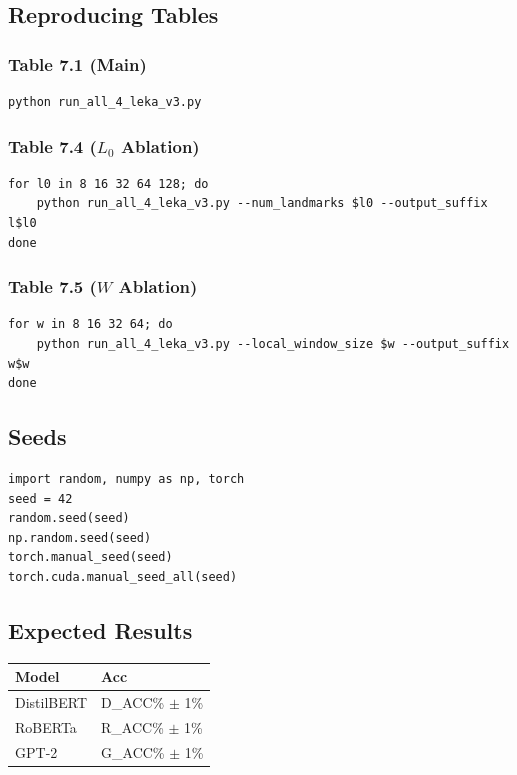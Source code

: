 \subsection{Reproducing Tables}

\subsubsection{Table 7.1 (Main)}
\begin{lstlisting}
python run_all_4_leka_v3.py
\end{lstlisting}

\subsubsection{Table 7.4 ($L_0$ Ablation)}
\begin{lstlisting}
for l0 in 8 16 32 64 128; do
    python run_all_4_leka_v3.py --num_landmarks $l0 --output_suffix l$l0
done
\end{lstlisting}

\subsubsection{Table 7.5 ($W$ Ablation)}
\begin{lstlisting}
for w in 8 16 32 64; do
    python run_all_4_leka_v3.py --local_window_size $w --output_suffix w$w
done
\end{lstlisting}

\subsection{Seeds}

\begin{lstlisting}
import random, numpy as np, torch
seed = 42
random.seed(seed)
np.random.seed(seed)
torch.manual_seed(seed)
torch.cuda.manual_seed_all(seed)
\end{lstlisting}

\subsection{Expected Results}

\begin{table}[H]
\centering
\small
\begin{tabular}{ll}
\toprule
\textbf{Model} & \textbf{Acc} \\
\midrule
DistilBERT & {{D\_ACC}}\% $\pm$ 1\% \\
RoBERTa & {{R\_ACC}}\% $\pm$ 1\% \\
GPT-2 & {{G\_ACC}}\% $\pm$ 1\% \\
\bottomrule
\end{tabular}
\end{table}


